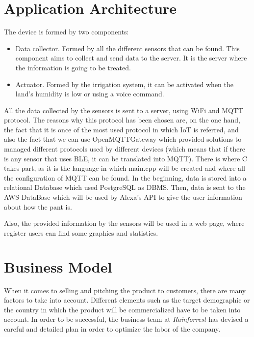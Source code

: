 \documentclass[english,runningheads,a4paper]{llncs}[2018/03/10]
\begin{document}
\section*{Application Architecture}

The device is formed by two components:
\begin{itemize}
\item Data collector. Formed by all the different sensors that can be found.
This component aims to collect and send data to the server. It is the server
where the information is going to be treated.
\item Actuator. Formed by the irrigation system, it can be activated when the
land's humidity is low or using a voice command.
\end{itemize}

All the data collected by the sensors is sent to a server, using WiFi and
MQTT protocol. The reasons why this protocol has been chosen are, on the 
one hand, the fact that it is once of the most used protocol in which IoT is
referred,
and also the fact that we can use OpenMQTTGateway which provided 
solutions to managed different protocols used by different devices (which means
that if there is any sensor that uses BLE, it can be translated into MQTT).
There is where C takes part, as it is the language in which main.cpp will be
created and where all the configuration of MQTT can be found. In the beginning,
data is stored into a relational Database which used PostgreSQL as DBMS. Then,
data is sent to the AWS DataBase which will be used by Alexa's API to give
the user information about how the pant is.

Also, the provided information by the sensors will be used in a web page, where
register users can find some graphics and statistics.


\section*{Business Model}

When it comes to selling and pitching the product to customers, there are many
factors to take into account. Different elements such as the target demographic
or the country in which the product will be commercialized have to be taken into
account. In order to be successful, the business team at \textit{Rainforrest}
has devised a careful and detailed plan in order to optimize the labor of the
company.
\end{document}
